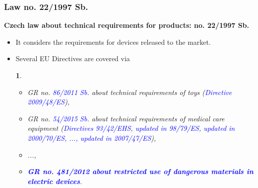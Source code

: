 \documentclass{beamer}
\newtheorem{myDef}{}
\begin{document}
	\begin{frame}
    \frametitle{Law no. 22/1997 Sb.}
		\small
		\textbf{Czech law about technical requirements for products: no. 22/1997 Sb.}
		\begin{itemize}
			\item It considers the requirements for devices released to the market.
			\item Several EU Directives are covered via 
			\begin{myDef}
			\begin{itemize}
				\item GR no. \textcolor{blue}{86/2011 Sb.} about technical requirements of toys (\textcolor{blue}{Directive 2009/48/ES}),
				\item GR no. \textcolor{blue}{54/2015 Sb.} about technical requirements of medical care equipment (\textcolor{blue}{Directives 93/42/EHS, updated in 98/79/ES, updated in 2000/70/ES, ..., updated in 2007/47/ES}),
				\item ...,
				\item \textcolor{blue}{\textbf{GR no. 481/2012 about restricted use of dangerous materials in electric devices}.}
			\end{itemize}
			\end{myDef}
		\end{itemize}
		
	\end{frame}
	
\end{document}

